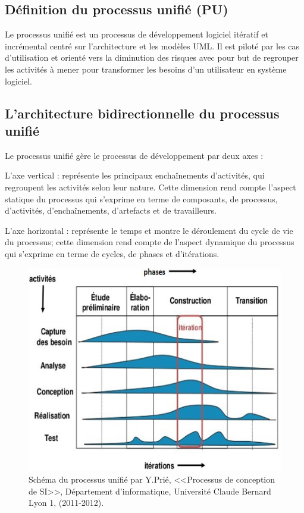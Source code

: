 \documentclass{report}
\begin{document}
\subsection{Définition du processus unifié (PU)}
Le processus unifié est un processus de développement logiciel itératif et incrémental centré sur l'architecture et les modèles UML. Il est piloté par les cas d’utilisation et orienté vers la diminution des risques avec pour but de regrouper les activités à mener pour transformer les besoins d'un utilisateur en système logiciel.

\subsection{L'architecture bidirectionnelle du processus unifié}
Le processus unifié gère le processus de développement par deux axes :

L'axe vertical : représente les principaux enchaînements d'activités, qui regroupent les activités selon leur nature. Cette dimension rend compte l'aspect statique du processus qui s'exprime en terme de composants, de processus, d'activités, d'enchaînements, d'artefacts et de travailleurs.

L'axe horizontal : représente le temps et montre le déroulement du cycle de vie du processus; cette dimension rend compte de l'aspect dynamique du processus qui s'exprime en terme de cycles, de phases et d'itérations.

\begin{figure}[!htb]
\centering
\includegraphics[width=9 cm]{processus UP.png}
\begin{center}
\caption{Schéma du processus unifié par Y.Prié, <<Processus de conception de SI>>, Département d'informatique, Université Claude Bernard Lyon 1, (2011-2012).}
\end{center}
\end{figure}
\end{document}

